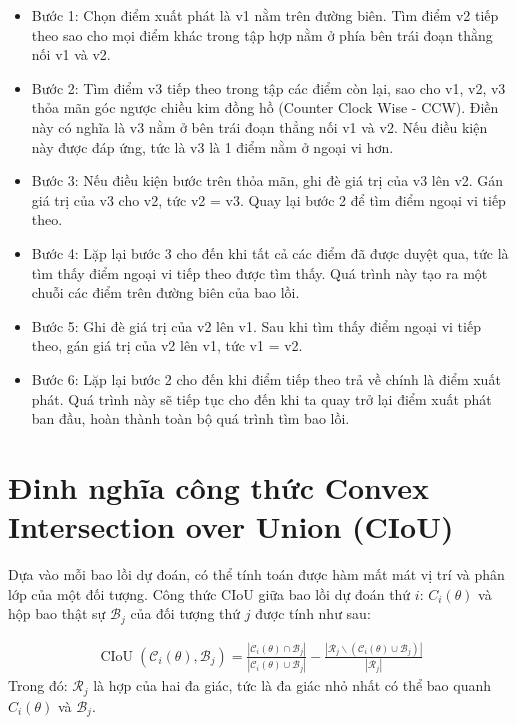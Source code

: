 \documentclass[12pt,a4paper,openany,oneside]{report}
\begin{document}
\begin{itemize}
	\item Bước 1: Chọn điểm xuất phát là v1 nằm trên đường biên. Tìm điểm v2 tiếp theo sao cho mọi điểm khác trong tập hợp nằm ở phía bên trái đoạn thằng nối v1 và v2.
	\item Bước 2: Tìm điểm v3 tiếp theo trong tập các điểm còn lại, sao cho v1, v2, v3 thỏa mãn góc ngược chiều kim đồng hồ (Counter Clock Wise - CCW). Điền này có nghĩa là v3 nằm ở bên trái đoạn thẳng nối v1 và v2. Nếu điều kiện này được đáp ứng, tức là v3 là 1 điểm nằm ở ngoại vi hơn.
	\item Bước 3: Nếu điều kiện bước trên thỏa mãn, ghi đè giá trị của v3 lên v2. Gán giá trị của v3 cho v2, tức v2 = v3. Quay lại bước 2 để tìm điểm ngoại vi tiếp theo.
	\item Bước 4: Lặp lại bước 3 cho đến khi tất cả các điểm đã được duyệt qua, tức là tìm thấy điểm ngoại vi tiếp theo được tìm thấy. Quá trình này tạo ra một chuỗi các điểm trên đường biên của bao lồi.
	\item Bước 5: Ghi đè giá trị của v2 lên v1. Sau khi tìm thấy điểm ngoại vi tiếp theo, gán giá trị của v2 lên v1, tức v1 = v2.
	\item  Bước 6: Lặp lại bước 2 cho đến khi điểm tiếp theo trả về chính là điểm xuất phát. Quá trình này sẽ tiếp tục cho đến khi ta quay trở lại điểm xuất phát ban đầu, hoàn thành toàn bộ quá trình tìm bao lồi.
\end{itemize}

\section{Đinh nghĩa công thức Convex Intersection over Union (CIoU)}
Dựa vào mỗi bao lồi dự đoán, có thể tính toán được hàm mất mát vị trí và phân lớp của một đối tượng. Công thức CIoU giữa bao lồi dự đoán thứ $i$:  $C_i(\theta)$ và hộp bao thật sự $\mathcal{B}_j$ của đối tượng thứ $j$ được tính như sau:

\begin{align} \label{CioU_fomular}
	\operatorname{CIoU}\left(\mathcal{C}_i(\theta), \mathcal{B}_j\right)=\frac{\left|\mathcal{C}_i(\theta) \cap \mathcal{B}_j\right|}{\left|\mathcal{C}_i(\theta) \cup \mathcal{B}_j\right|}-\frac{\left|\mathcal{R}_j \backslash\left(\mathcal{C}_i(\theta) \cup \mathcal{B}_j\right)\right|}{\left|\mathcal{R}_j\right|}
\end{align}
Trong đó: $\mathcal{R}_j$ là hợp của hai đa giác, tức là đa giác nhỏ nhất có thể bao quanh  $C_i(\theta)$ và $\mathcal{B}_j$.
\end{document}
